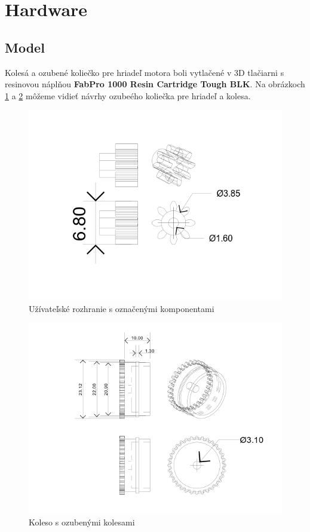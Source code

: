 
\section{Hardware}
\subsection{Model}
\label{sec:hardware}
Kolesá a ozubené koliečko pre hriadeľ motora boli vytlačené v 3D tlačiarni s resinovou náplňou \textbf{FabPro 1000 Resin Cartridge Tough BLK}. Na obrázkoch \ref{fig:gear} a \ref{fig:wheel_w_gear} môžeme vidieť návrhy ozubeého koliečka pre hriadeľ a kolesa. 

\begin{figure}[!htbp]
        \centering
        \includegraphics[scale=0.8]{includes/images/motor_gear.png}
        \caption{Užívateľské rozhranie s označenými komponentami}
        \label{fig:gear}
\end{figure}

\begin{figure}[!htbp]
        \centering
        \includegraphics[scale=0.8]{includes/images/wheel_w_gear_2_blueprint.png}
        \caption{Koleso s ozubenými kolesami}
        \label{fig:wheel_w_gear}
\end{figure}
\newpage
